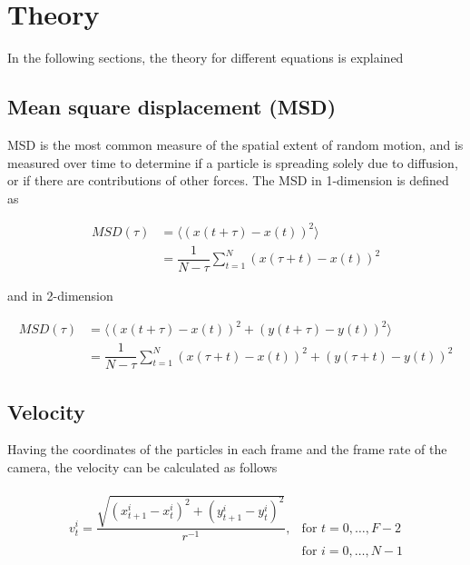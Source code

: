 \chapter{Theory} \label{theory}

In the following sections, the theory for different equations is explained

\section{Mean square displacement (MSD)} \label{theory_msd}

MSD is the most common measure of the spatial extent of random motion, and is measured 
over time to determine if a particle is spreading solely due to diffusion, or if there 
are contributions of other forces\cite{tarantino2014tnf}. The MSD in 1-dimension is defined as

\begin{align}
    MSD(\tau)   &=  \langle (x(t+\tau)-x(t))^2\rangle \\
                &=  \dfrac{1}{N-\tau}\sum_{t=1}^{N}\left( x(\tau+t)-x(t)\right)^2
\end{align}

and in 2-dimension

\begin{align}
    MSD(\tau)   &=  \langle (x(t+\tau)-x(t))^2 + (y(t+\tau)-y(t))^2\rangle \label{eqn:2dim_msd}\\
                &=  \dfrac{1}{N-\tau}\sum_{t=1}^{N}\left( x(\tau+t)-x(t)\right)^2 + \left( y(\tau+t)-y(t)\right)^2
\end{align}

\section{Velocity} \label{theory_velocity}

Having the coordinates of the particles in each frame and the frame rate of the camera, 
the velocity can be calculated as follows

\begin{align}
    \begin{array}{lr}
        v_t^i = \dfrac{\sqrt{\left(x_{t+1}^i-x_t^i\right)^2+\left(y_{t+1}^i-y_t^i\right)^2}}{r^{-1}}, 
        & \text{for } t=0,\ldots,F-2\\
        & \text{for } i=0,\ldots,N-1
    \end{array}
    \label{eq:velocity_1par1}
\end{align}

